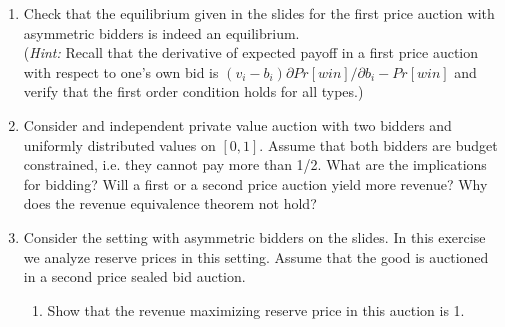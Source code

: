 \documentclass[a4paper,12pt]{article}
\begin{document}
\begin{enumerate}
\item Check that the equilibrium given in the slides for the first price auction with asymmetric bidders is indeed an equilibrium.\\
  (\emph{Hint: }Recall that the derivative of expected payoff in a first price auction with respect to one's own bid is $(v_i-b_i)\partial Pr[win]/\partial b_i-Pr[win]$ and verify that the first order condition holds for all types.)
\item Consider and independent private value auction with two bidders and uniformly distributed values on $[0,1]$. Assume that both bidders are budget constrained, i.e. they cannot pay more than 1/2. What are the implications for bidding? Will a first or a second price auction yield more revenue?  Why does the revenue equivalence theorem not hold?
\item Consider the setting with asymmetric bidders on the slides. In this exercise we analyze reserve prices in this setting. Assume that the good is auctioned in a second price sealed bid auction.
  \begin{enumerate}
  \item Show that the revenue maximizing reserve price in this auction is 1.

\end{enumerate}
\end{enumerate}
\end{document}
